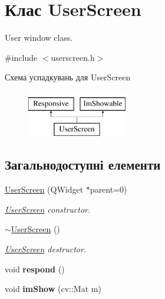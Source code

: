 \hypertarget{classUserScreen}{\section{Клас User\-Screen}
\label{classUserScreen}
}


User window class.  




{\ttfamily \#include $<$userscreen.\-h$>$}

Схема успадкувань для User\-Screen\begin{figure}[H]
\begin{center}
\leavevmode
\includegraphics[height=2.000000cm]{classUserScreen}
\end{center}
\end{figure}
\subsection*{Загальнодоступні елементи}
\begin{DoxyCompactItemize}
\item 
\hyperlink{classUserScreen_a27136456b8f1b4d10dfe1cbfc9c43d7c}{User\-Screen} (Q\-Widget $\ast$parent=0)
\begin{DoxyCompactList}\small\item\em \hyperlink{classUserScreen}{User\-Screen} constructor. \end{DoxyCompactList}\item 
\hypertarget{classUserScreen_a30ef13619f5f42c72064ccd57df79e82}{\hyperlink{classUserScreen_a30ef13619f5f42c72064ccd57df79e82}{$\sim$\-User\-Screen} ()}\label{classUserScreen_a30ef13619f5f42c72064ccd57df79e82}

\begin{DoxyCompactList}\small\item\em \hyperlink{classUserScreen}{User\-Screen} destructor. \end{DoxyCompactList}\item 
\hypertarget{classUserScreen_a89419eeb0d30311360c816f2a29355df}{void {\bfseries respond} ()}\label{classUserScreen_a89419eeb0d30311360c816f2a29355df}

\item 
\hypertarget{classUserScreen_a960593e46a29dde2ebecde6bced1eaf9}{void {\bfseries im\-Show} (cv\-::\-Mat m)}\label{classUserScreen_a960593e46a29dde2ebecde6bced1eaf9}

\end{DoxyCompactItemize}
